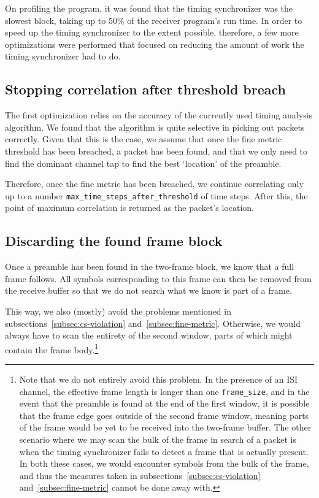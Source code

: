 On profiling the program, it was found that the timing synchronizer was the
slowest block, taking up to 50\% of the receiver program's run time. In order
to speed up the timing synchronizer to the extent possible, therefore, a few
more optimizations were performed that focused on reducing the amount of work
the timing synchronizer had to do.

\subsection{Stopping correlation after threshold breach}
\label{subsec:stop-corr}

The first optimization relies on the accuracy of the currently used timing
analysis algorithm. We found that the algorithm is quite selective in picking
out packets correctly. Given that this is the case, we assume that once the
fine metric threshold has been breached, a packet has been found, and that we
only need to find the dominant channel tap to find the best `location' of the
preamble.

Therefore, once the fine metric has been breached, we continue correlating only
up to a number \verb+max_time_steps_after_threshold+ of time steps. After this,
the point of maximum correlation is returned as the packet's location.

\subsection{Discarding the found frame block}
\label{subsec:frame-discard}

Once a preamble has been found in the two-frame block, we know that a full
frame follows. All symbols corresponding to this frame can then be removed from
the receive buffer so that we do not search what we know is part of a frame.

This way, we also (mostly) avoid the problems mentioned in
subsections~\ref{subsec:cs-violation} and~\ref{subsec:fine-metric}. Otherwise,
we would always have to scan the entirety of the second window, parts of which
might contain the frame body.\footnote{Note that we do not entirely avoid this
problem. In the presence of an ISI channel, the effective frame length is
longer than one \verb+frame_size+, and in the event that the preamble is found
at the end of the first window, it is possible that the frame edge goes outside
of the second frame window, meaning parts of the frame would be yet to be
received into the two-frame buffer. The other scenario where we may scan the
bulk of the frame in search of a packet is when the timing synchronizer fails
to detect a frame that is actually present. In both these cases, we would
encounter symbols from the bulk of the frame, and thus the measures taken in
subsections~\ref{subsec:cs-violation} and~\ref{subsec:fine-metric} cannot be
done away with.}

